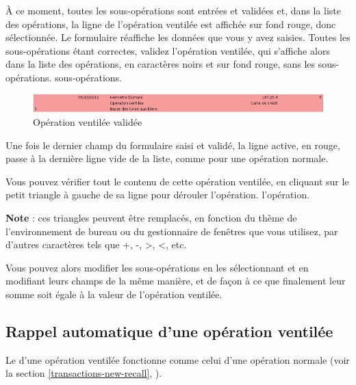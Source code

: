 À ce moment, toutes les sous-opérations sont entrées et validées et, dans la liste des opérations, la ligne de l'opération ventilée est affichée sur fond rouge{\couleur}, donc sélectionnée. Le formulaire réaffiche les données que vous y avez saisies. Toutes les sous-opérations étant correctes, validez l'opération ventilée, qui s'affiche alors dans la liste des opérations, en caractères noirs et sur fond rouge{\couleur}, sans les \ifIllustration sous-opérations.
\else sous-opérations.
\fi

\ifIllustration
\begin{figure}[htp]
\begin{center}
\includegraphics[scale=0.5]{image/screenshot/transactions_breakdown_oneLine}
\end{center}
\caption{Opération ventilée validée}
\label{transactions-breakdown-oneLine-img}
\end{figure}
\fi

Une fois le dernier champ du formulaire saisi et validé, la ligne active, en rouge{\couleur}, passe à la dernière ligne vide de la liste, comme pour une opération normale.

Vous pouvez vérifier tout le contenu de cette opération ventilée, en cliquant sur le petit triangle à gauche de sa ligne pour dérouler \ifIllustration l'opération. 
\else l'opération.
\fi

\textbf{Note} : ces triangles peuvent être remplacés, en fonction du thème de l'environnement de bureau ou du gestionnaire de fenêtres que vous utilisez, par d'autres caractères tels que +, -, >, <, etc.

Vous pouvez alors modifier les sous-opérations en les sélectionnant et en modifiant leurs champs de la même manière, et de façon à ce que finalement leur somme soit égale à la valeur de l'opération ventilée.


\subsection{Rappel automatique d'une opération ventilée\label{transactions-breakdown-recall}}

Le  d'une opération ventilée 
fonctionne comme celui d'une opération normale (voir la section \vref{transactions-new-recall}, ). 

